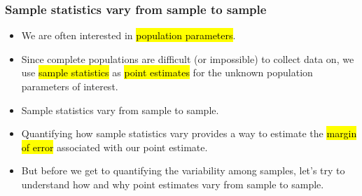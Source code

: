 \documentclass[11pt,containsverbatim,handout,xcolor=xelatex,dvipsnames,table]{beamer}
\begin{document}
\begin{frame}
\frametitle{Sample statistics vary from sample to sample}

\begin{itemize}

\item We are often interested in \hl{population parameters}.

\item Since complete populations are difficult (or impossible) to collect data on, we use \hl{sample statistics} as \hl{point estimates} for the unknown population parameters of interest.

\item Sample statistics vary from sample to sample.

\item Quantifying how sample statistics vary provides a way to estimate the \hl{margin of error} associated with our point estimate.

\item But before we get to quantifying the variability among samples, let's try to understand how and why point estimates vary from sample to sample.

\end{itemize}




\end{frame}

\end{document}
